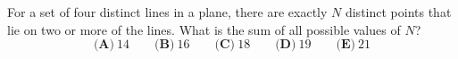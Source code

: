 For a set of four distinct lines in a plane, there are exactly $N$ distinct points that lie on two or more of the lines. What is the sum of all possible values of $N$?
\[\textbf{(A)}\ 14\qquad\textbf{(B)}\ 16\qquad\textbf{(C)}\ 18\qquad\textbf{(D)}\ 19\qquad\textbf{(E)}\ 21\]
